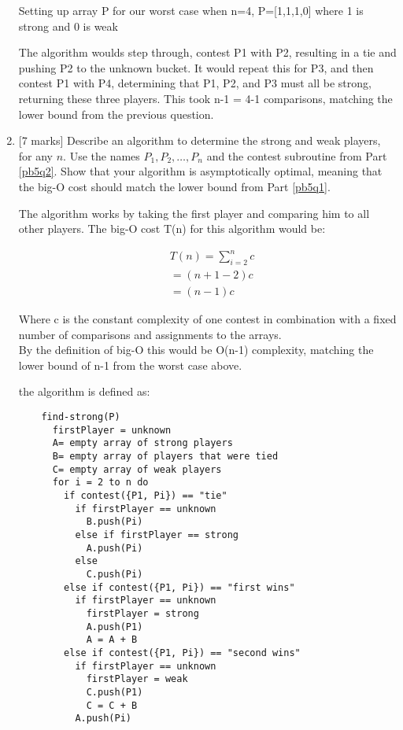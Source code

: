 \documentclass[12pt]{article}
\begin{document}
\begin{enumerate}
  Setting up array P for our worst case when n=4, P=[1,1,1,0] where 1 is strong and 0 is weak

  The algorithm woulds step through, contest P1 with P2, resulting in a tie and pushing P2 to the unknown bucket. It would repeat this for P3, and then contest P1 with P4, determining that P1, P2, and P3 must all be strong, returning these three players. This took n-1 = 4-1 comparisons, matching the lower bound from the previous question.
  
  \item {[}7 marks] Describe an algorithm to determine the strong and weak
  players, for any $n$. Use the names $P_1, P_2, \ldots, P_n$ and the contest
  subroutine from Part \ref{pb5q2}. Show that your algorithm is asymptotically
  optimal, meaning that the big-O cost should match the lower bound from Part
  \ref{pb5q1}.

  The algorithm works by taking the first player and comparing him to all other players. The big-O cost T(n) for this algorithm would be:

  \begin{align*}
    &T(n) = \sum_{i=2}^n c\\
    &= (n+1-2)c\\
    &= (n-1)c
  \end{align*}

  Where c is the constant complexity of one contest in combination with a fixed number of comparisons and assignments to the arrays.\\
  By the definition of big-O this would be O(n-1) complexity, matching the lower bound of n-1 from the worst case above.

  the algorithm is defined as:

  \begin{verbatim}
    find-strong(P)
      firstPlayer = unknown
      A= empty array of strong players
      B= empty array of players that were tied
      C= empty array of weak players
      for i = 2 to n do
        if contest({P1, Pi}) == "tie"
          if firstPlayer == unknown
            B.push(Pi)
          else if firstPlayer == strong
            A.push(Pi)
          else
            C.push(Pi)
        else if contest({P1, Pi}) == "first wins"
          if firstPlayer == unknown
            firstPlayer = strong
            A.push(P1)
            A = A + B
        else if contest({P1, Pi}) == "second wins"
          if firstPlayer == unknown
            firstPlayer = weak
            C.push(P1)
            C = C + B
          A.push(Pi)
  \end{verbatim}
\end{enumerate}
\end{document}
